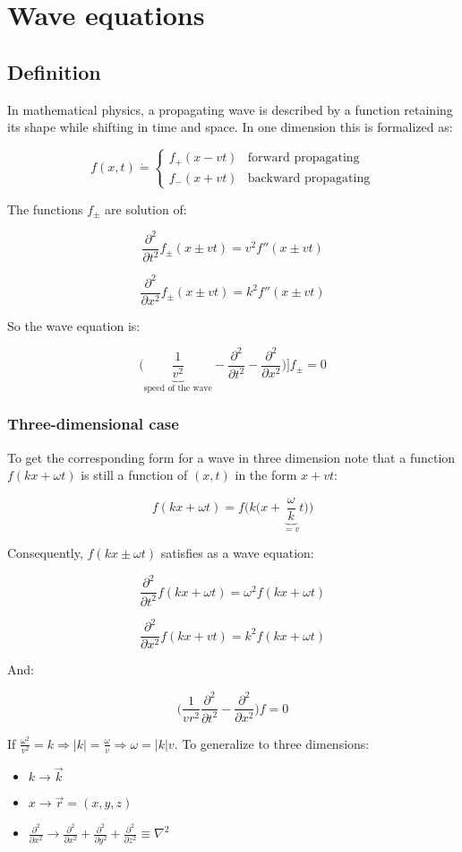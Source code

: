 \chapter{Wave equations}

\section{Definition}
In mathematical physics, a propagating wave is described by a function retaining its shape while shifting in time and space.
In one dimension this is formalized as:

$$f(x,t)\dot{=}\begin{cases}f_+(x-v t) &\text{forward propagating}\\f_-(x+vt) &\text{backward propagating}\end{cases}$$

The functions $f_\pm$ are solution of:

$$\frac{\partial^2{}}{\partial{t^2}}f_\pm(x\pm vt) = v^2f''(x\pm vt)$$

$$\frac{\partial^2{}}{\partial{x^2}}f_\pm(x\pm vt) = k^2f''(x\pm vt)$$

So the wave equation is:

$$\biggl(\underbrace{\frac{1}{v^2}}_{\text{speed of the wave}}-\frac{\partial^2{}}{\partial{t^2}}-\frac{\partial^2{}}{\partial{x^2}}\biggr)]f_\pm = 0$$

  \subsection{Three-dimensional case}
  To get the corresponding form for a wave in three dimension note that a function $f(kx + \omega t)$ is still a function of $(x,t)$ in the form $x+vt$:

  $$f(kx+\omega t) = f\biggl(k\biggl(x+\underbrace{\frac{\omega}{k}}_{=v}t\biggr)\biggr)$$

  Consequently, $f(kx\pm\omega t)$ satisfies as a wave equation:

  $$\frac{\partial^2{}}{\partial{t^2}}f(kx+ \omega t) = \omega^2f(kx+ \omega t)$$

  $$\frac{\partial^2{}}{\partial{x^2}}f(kx + vt) = k^2f(kx + \omega t)$$

  And:

  $$\biggl(\frac{1}{vr^2}\frac{\partial^2{}}{\partial{t^2}} - \frac{\partial^2{}}{\partial{x^2}}\biggr)f = 0$$

  If $\frac{\omega^2}{v^2} = k\Rightarrow |k| = \frac{\omega}{v}\Rightarrow \omega = |k|v$.
  To generalize to three dimensions:
  \begin{itemize}
    \item $k\rightarrow \vec{k}$
    \item $x\rightarrow \vec{r}=(x,y,z)$
    \item $\frac{\partial^2{}}{\partial{x^2}}\rightarrow \frac{\partial^2{}}{\partial{x^2}}+\frac{\partial^2{}}{\partial{y^2}}+\frac{\partial^2{}}{\partial{z^2}}\equiv\nabla^2$
  \end{itemize}

